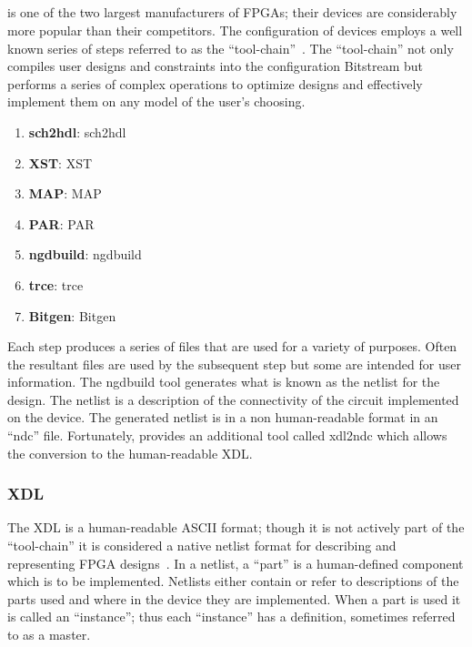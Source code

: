 \subsection{\Xilinx}
\Xilinx is one of the two largest manufacturers of \acrshort{FPGA}s; their devices are considerably more popular than their competitors.
The configuration of devices employs a well known series of steps referred to as the \Xilinx ``tool-chain''~\cite{xilnxDevManual}.
The ``tool-chain'' not only compiles user designs and constraints into the configuration \gls{Bitstream} but performs a series of complex operations to optimize designs and effectively implement them on any \Xilinx model of the user's choosing.
\begin{enumerate}
	\item \textbf{\gls{sch2hdl}}: \glsdesc{sch2hdl}
	\item \textbf{\gls{XST}}: \glsdesc{XST}
	\item \textbf{\gls{MAP}}: \glsdesc{MAP}
	\item \textbf{\gls{PAR}}: \glsdesc{PAR}
	\item \textbf{\gls{ngdbuild}}: \glsdesc{ngdbuild}
	\item \textbf{\gls{trce}}: \glsdesc{trce}
	\item \textbf{\gls{Bitgen}}: \glsdesc{Bitgen}
\end{enumerate}
Each step produces a series of files that are used for a variety of purposes. 
Often the resultant files are used by the subsequent step but some are intended for user information.
The \gls{ngdbuild} tool generates what is known as the netlist for the design.
The netlist is a description of the connectivity of the circuit implemented on the device. 
The generated netlist is in a non human-readable format in an ``ndc'' file.
Fortunately, \Xilinx provides an additional tool called \gls{xdl2ndc} which allows the conversion to the human-readable \acrfull{XDL}.
\subsubsection{\acrfull{XDL}} \label{sec:XDL}
The \acrfull{XDL} is a human-readable ASCII format; though it is not actively part of the ``tool-chain'' it is considered a native netlist format for describing and representing \acrshort{FPGA} designs~\cite{xdlTutorial}. 
In a netlist, a ``part'' is a human-defined component which is to be implemented.
Netlists either contain or refer to descriptions of the parts used and where in the device they are implemented.
When a part is used it is called an ``instance''; thus each ``instance'' has a definition, sometimes referred to as a master.

